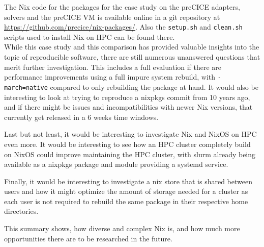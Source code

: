 \documentclass{eceasst}
\begin{document}
The Nix code for the packages for the case study on the preCICE adapters, solvers and the preCICE VM is available online in a git repository at \url{https://github.com/precice/nix-packages/}.
Also the \texttt{setup.sh} and \texttt{clean.sh} scripts used to install Nix on HPC can be found there.\\


While this case study and this comparison has provided valuable insights into the topic of reproducible software, there are still numerous unanswered questions that merit further investigation.
This includes a full evaluation if there are performance improvements using a full impure system rebuild, with \texttt{-march=native} compared to only rebuilding the package at hand.
It would also be interesting to look at trying to reproduce a nixpkgs commit from 10 years ago, and if there might be issues and incompatibilities with newer Nix versions, that currently get released in a 6 weeks time windows.

Last but not least, it would be interesting to investigate Nix and NixOS on HPC even more.
It would be interesting to see how an HPC cluster completely build on NixOS could improve maintaining the HPC cluster, with slurm already being available as a nixpkgs package and module providing a systemd service.

Finally, it would be interesting to investigate a nix store that is shared between users and how it might optimize the amount of storage needed for a cluster as each user is not required to rebuild the same package in their respective home directories.

This summary shows, how diverse and complex Nix is, and how much more opportunities there are to be researched in the future.

\nocite{*}


\end{document}

